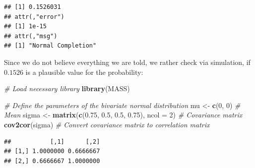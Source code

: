 \documentclass[
]{book}
\newenvironment{Shaded}{\begin{snugshade}}{\end{snugshade}}
\newcommand{\AttributeTok}[1]{\textcolor[rgb]{0.13,0.29,0.53}{#1}}
\newcommand{\CommentTok}[1]{\textcolor[rgb]{0.56,0.35,0.01}{\textit{#1}}}
\newcommand{\DecValTok}[1]{\textcolor[rgb]{0.00,0.00,0.81}{#1}}
\newcommand{\FloatTok}[1]{\textcolor[rgb]{0.00,0.00,0.81}{#1}}
\newcommand{\FunctionTok}[1]{\textcolor[rgb]{0.13,0.29,0.53}{\textbf{#1}}}
\newcommand{\NormalTok}[1]{#1}
\newcommand{\OtherTok}[1]{\textcolor[rgb]{0.56,0.35,0.01}{#1}}
\begin{document}
\begin{verbatim}
## [1] 0.1526031
## attr(,"error")
## [1] 1e-15
## attr(,"msg")
## [1] "Normal Completion"
\end{verbatim}

Since we do not believe everything we are told, we rather check via simulation,
if \(0.1526\) is a plausible value for the probability:

\begin{Shaded}
\begin{Highlighting}[]
\CommentTok{\# Load necessary library}
\FunctionTok{library}\NormalTok{(MASS)}

\CommentTok{\# Define the parameters of the bivariate normal distribution}
\NormalTok{mu }\OtherTok{\textless{}{-}} \FunctionTok{c}\NormalTok{(}\DecValTok{0}\NormalTok{, }\DecValTok{0}\NormalTok{)                       }\CommentTok{\# Mean}
\NormalTok{sigma }\OtherTok{\textless{}{-}} \FunctionTok{matrix}\NormalTok{(}\FunctionTok{c}\NormalTok{(}\FloatTok{0.75}\NormalTok{, }\FloatTok{0.5}\NormalTok{, }\FloatTok{0.5}\NormalTok{, }\FloatTok{0.75}\NormalTok{), }\AttributeTok{ncol =} \DecValTok{2}\NormalTok{) }\CommentTok{\# Covariance matrix}
\FunctionTok{cov2cor}\NormalTok{(sigma)  }\CommentTok{\# Convert covariance matrix to correlation matrix}
\end{Highlighting}
\end{Shaded}

\begin{verbatim}
##           [,1]      [,2]
## [1,] 1.0000000 0.6666667
## [2,] 0.6666667 1.0000000
\end{verbatim}
\end{document}
